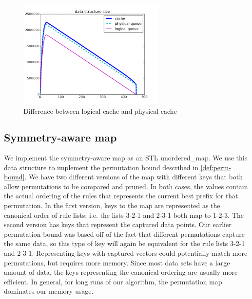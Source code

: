 \begin{figure}[t!]
\begin{center}
\includegraphics[width=0.65\textwidth]{figs/ela_compas-queue-cache-size-insertions.png}
\end{center}
\caption{Difference between logical cache and physical cache}
\label{fig:queue_gc}
\end{figure}

\subsection{Symmetry-aware map}
We implement the symmetry-aware map as an STL unordered\_map. 
We use this data structure to implement the permutation bound described in \ref{def:perm-bound}.
We have two different versions of the map with different keys that both allow permutations to be compared and pruned.
In both cases, the values contain the actual ordering of the rules that represents the current best prefix for that permutation.
In the first version, keys to the map are represented as the canonical order of rule lists: i.e. the lists 3-2-1 and 2-3-1 both map to 1-2-3.
The second version has keys that represent the captured data points.
Our earlier permutation bound was based off of the fact that different permutations capture the same data, so this type of key will again be equivalent for the rule lists 3-2-1 and 2-3-1.
Representing keys with captured vectors could potentially match more permutations, but requires more memory.
Since most data sets have a large amount of data, the keys representing the canonical ordering are usually more efficient.
In general, for long runs of our algorithm, the permutation map dominates our memory usage.

